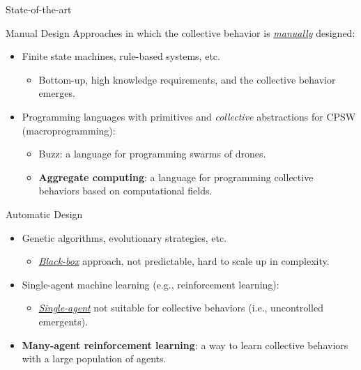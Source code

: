 \documentclass[presentation, 8pt,169]{beamer}\mode<presentation>{\usetheme{AMSBolognaFC}}
\begin{document}
\begin{frame}{State-of-the-art}

  \begin{exampleblock}{Manual Design}
    Approaches in which the collective behavior is \emph{\underline{manually}} designed:
    \begin{itemize}
      \item Finite state machines, rule-based systems, etc.
        \begin{itemize}
          \item Bottom-up, high knowledge requirements, and the collective behavior emerges.
        \end{itemize}
      \item Programming languages with primitives and \emph{collective} abstractions for CPSW (macroprogramming):
        \begin{itemize}
          \item Buzz: a language for programming swarms of drones.
          \item \textbf{Aggregate computing}: a language for programming collective behaviors based on computational fields.
        \end{itemize}
    \end{itemize}  
  \end{exampleblock}

  \begin{exampleblock}{Automatic Design}
    \begin{itemize}
      \item Genetic algorithms, evolutionary strategies, etc.
        \begin{itemize}
          \item \emph{\underline{Black-box}} approach, not predictable, hard to scale up in complexity.
        \end{itemize}
      \item Single-agent machine learning (e.g., reinforcement learning):
        \begin{itemize}
          \item \emph{\underline{Single-agent}} not suitable for collective behaviors (i.e., uncontrolled emergents).
        \end{itemize}
      \item \textbf{Many-agent reinforcement learning}: a way to learn collective behaviors with a large population of agents.
    \end{itemize}
  \end{exampleblock}
\end{frame}
\end{document}
